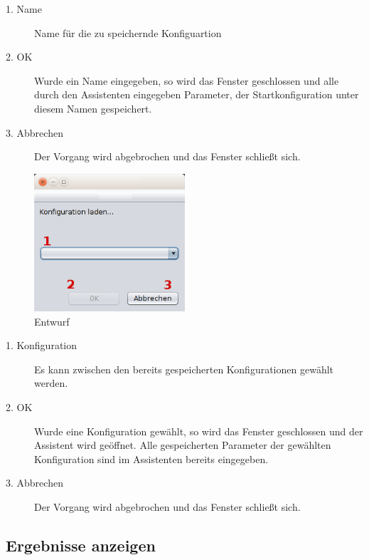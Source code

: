 \begin{description}

\item[1. Name] Name für die zu speichernde Konfiguartion
\item[2. OK] Wurde ein Name eingegeben, so wird das Fenster geschlossen und alle durch den Assistenten eingegeben Parameter, der Startkonfiguration unter diesem Namen gespeichert.
\item[3. Abbrechen] Der Vorgang wird abgebrochen und das Fenster schließt sich.

\end{description}

\pagebreak

\begin{figure}[hp] 
  \centering
     \includegraphics[width=0.5\textwidth]{GUI_Entwurf/KonfigLaden.png}
  \caption{Entwurf}
  \label{fig:Bild1}
\end{figure}

\begin{description}

\item[1. Konfiguration] Es kann zwischen den bereits gespeicherten Konfigurationen gewählt werden.
\item[2. OK] Wurde eine Konfiguration gewählt, so wird das Fenster geschlossen und der Assistent wird geöffnet. Alle gespeicherten Parameter der gewählten Konfiguration sind im Assistenten bereits eingegeben.
\item[3. Abbrechen] Der Vorgang wird abgebrochen und das Fenster schließt sich.

\end{description}

\pagebreak

\subsection{Ergebnisse anzeigen}


